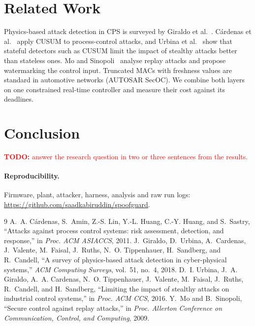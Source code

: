 \documentclass[10pt,twocolumn]{article}
\newcommand{\todo}[1]{\textcolor{red}{\textbf{TODO:} #1}}
\begin{document}
\section{Related Work}
Physics-based attack detection in CPS is surveyed by Giraldo et
al.~\cite{giraldo2018}. C\'ardenas et al.~\cite{cardenas2011} apply CUSUM to
process-control attacks, and Urbina et al.~\cite{urbina2016} show that stateful
detectors such as CUSUM limit the impact of stealthy attacks better than
stateless ones. Mo and Sinopoli~\cite{mo2009} analyse replay attacks and
propose watermarking the control input. Truncated MACs with freshness values
are standard in automotive networks (AUTOSAR SecOC). We combine both layers on
one constrained real-time controller and measure their cost against its
deadlines.

\section{Conclusion}
\todo{answer the research question in two or three sentences from the results.}

\paragraph{Reproducibility.} Firmware, plant, attacker, harness, analysis and
raw run logs: \url{https://github.com/saadkabiruddin/spoofguard}.

\begin{thebibliography}{9}\small
{} A.~A. C\'ardenas, S.~Amin, Z.-S. Lin, Y.-L. Huang, C.-Y. Huang,
  and S.~Sastry, ``Attacks against process control systems: risk assessment,
  detection, and response,'' in \emph{Proc. ACM ASIACCS}, 2011.
 J.~Giraldo, D.~Urbina, A.~Cardenas, J.~Valente, M.~Faisal,
  J.~Ruths, N.~O. Tippenhauer, H.~Sandberg, and R.~Candell, ``A survey of
  physics-based attack detection in cyber-physical systems,'' \emph{ACM
  Computing Surveys}, vol.~51, no.~4, 2018.
 D.~I. Urbina, J.~A. Giraldo, A.~A. Cardenas, N.~O. Tippenhauer,
  J.~Valente, M.~Faisal, J.~Ruths, R.~Candell, and H.~Sandberg, ``Limiting the
  impact of stealthy attacks on industrial control systems,'' in \emph{Proc. ACM
  CCS}, 2016.
 Y.~Mo and B.~Sinopoli, ``Secure control against replay attacks,''
  in \emph{Proc. Allerton Conference on Communication, Control, and Computing}, 2009.
\end{thebibliography}
\end{document}
